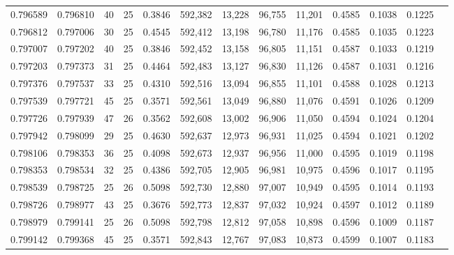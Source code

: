 \begin{tabular}{rrrrrrrrrrrrr}
0.796589 & 0.796810 &    40 &  25 &                                     0.3846 & 592,382 &  13,228 &  96,755 &  11,201 & 0.4585 & 0.1038 & 0.1225 \\
0.796812 & 0.797006 &    30 &  25 &                                     0.4545 & 592,412 &  13,198 &  96,780 &  11,176 & 0.4585 & 0.1035 & 0.1223 \\
0.797007 & 0.797202 &    40 &  25 &                                     0.3846 & 592,452 &  13,158 &  96,805 &  11,151 & 0.4587 & 0.1033 & 0.1219 \\
0.797203 & 0.797373 &    31 &  25 &                                     0.4464 & 592,483 &  13,127 &  96,830 &  11,126 & 0.4587 & 0.1031 & 0.1216 \\
0.797376 & 0.797537 &    33 &  25 &                                     0.4310 & 592,516 &  13,094 &  96,855 &  11,101 & 0.4588 & 0.1028 & 0.1213 \\
0.797539 & 0.797721 &    45 &  25 &                                     0.3571 & 592,561 &  13,049 &  96,880 &  11,076 & 0.4591 & 0.1026 & 0.1209 \\
0.797726 & 0.797939 &    47 &  26 &                                     0.3562 & 592,608 &  13,002 &  96,906 &  11,050 & 0.4594 & 0.1024 & 0.1204 \\
0.797942 & 0.798099 &    29 &  25 &                                     0.4630 & 592,637 &  12,973 &  96,931 &  11,025 & 0.4594 & 0.1021 & 0.1202 \\
0.798106 & 0.798353 &    36 &  25 &                                     0.4098 & 592,673 &  12,937 &  96,956 &  11,000 & 0.4595 & 0.1019 & 0.1198 \\
0.798353 & 0.798534 &    32 &  25 &                                     0.4386 & 592,705 &  12,905 &  96,981 &  10,975 & 0.4596 & 0.1017 & 0.1195 \\
0.798539 & 0.798725 &    25 &  26 &                                     0.5098 & 592,730 &  12,880 &  97,007 &  10,949 & 0.4595 & 0.1014 & 0.1193 \\
0.798726 & 0.798977 &    43 &  25 &                                     0.3676 & 592,773 &  12,837 &  97,032 &  10,924 & 0.4597 & 0.1012 & 0.1189 \\
0.798979 & 0.799141 &    25 &  26 &                                     0.5098 & 592,798 &  12,812 &  97,058 &  10,898 & 0.4596 & 0.1009 & 0.1187 \\
0.799142 & 0.799368 &    45 &  25 &                                     0.3571 & 592,843 &  12,767 &  97,083 &  10,873 & 0.4599 & 0.1007 & 0.1183 \\

\end{tabular}
